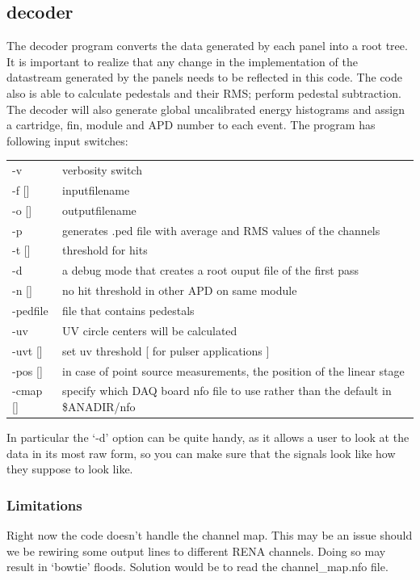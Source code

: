 \documentclass[12pt]{article}
\begin{document}
\subsection{decoder}
The decoder program converts the data generated by each panel into a root tree. It is important to realize that any change in the implementation of the datastream generated by the panels needs to be reflected in this code. The code also is able to calculate pedestals and their RMS; perform pedestal subtraction. The decoder will also generate global uncalibrated energy histograms and assign a cartridge, fin, module and APD number to each event. The program has following input switches:\\
\begin{tabular}{ll}
   -v  &  verbosity switch \\
   -f [] & inputfilename \\
   -o [] & outputfilename \\
   -p  & generates .ped file with average and RMS values of the channels \\
   -t [] & threshold for hits \\
   -d  & a debug mode that creates a root ouput file of the first pass \\
   -n  []& no hit threshold in other APD on same module \\
   -pedfile & file that contains pedestals\\
   -uv & UV circle centers will be calculated\\
   -uvt []& set uv threshold [ for pulser applications ]\\
   -pos []& in case of point source measurements, the position of the linear stage\\
   -cmap [] & specify which DAQ board nfo file to use rather than the default in \$ANADIR/nfo

\end{tabular}
In particular the `-d' option can be quite handy, as it allows a user to look at the data in its most raw form, so you can make sure that the signals look like how they suppose to look like. 

\subsubsection{Limitations} 
Right now the code doesn't handle the channel map. This may be an issue should we be rewiring some output lines to different RENA channels. Doing so may result in `bowtie' floods. Solution would be to read the channel\_map.nfo file. 
\end{document}
